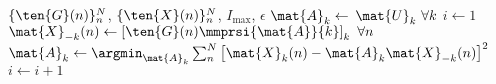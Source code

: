 \begin{algorithmic}[1]
  \Require $\{\ten{G}(n)\}_n^N$, $\{\ten{X}(n)\}_n^N$, $I_\text{max}$, $\epsilon$
  \State $\mat{A}_k \gets $ $\mat{U}_k \ \forall k$
  \State $i\gets 1$
  \Repeat
  \State $\mat{X}_{-k}(n)\gets\left[\ten{G}(n)\mmprsi{\mat{A}}{k}\right]_k \ \forall n$
  \State
  $\mat{A}_k\gets\textstyle{\argmin_{\mat{A}_k}\sum_n^N}\left[\mat{X}_k(n)-\mat{A}_k\mat{X}_{-k}(n)\right]^2$
  \EndFor
  \State $i\gets i+1$
\end{algorithmic}
